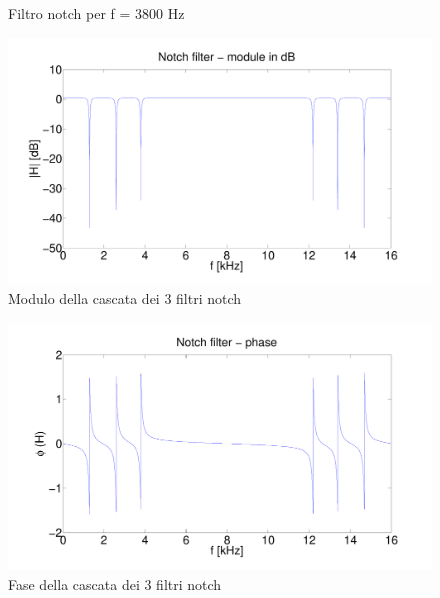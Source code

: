 \documentclass[10pt,A4]{article}
\begin{document}
\begin{figure}[h!]
  \centering
  \caption{Filtro notch per f = 3800 Hz}
  \label{fig:3800}
\end{figure}

\clearpage

\begin{figure}[h!]
  \centering
  \includegraphics[width = 1\textwidth, keepaspectratio]{images/NotchTotMod.pdf}
  \caption{Modulo della cascata dei 3 filtri notch}
  \label{fig:modtot}
\end{figure}

\begin{figure}[h!]
  \centering
  \includegraphics[width = 1\textwidth, keepaspectratio]{images/NotchTotPh.pdf}
  \caption{Fase della cascata dei 3 filtri notch}
  \label{fig:phtot}
\end{figure}
\end{document}
